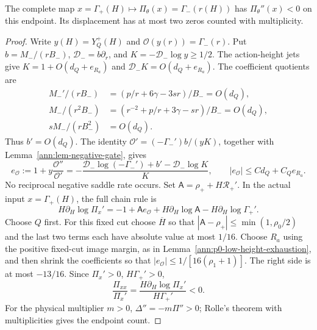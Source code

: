 \begin{proposition}\label{ann:prop-endpoint-curvature}
The complete map
\(x=\Gamma_+(H)\mapsto\Pi_\theta(x)=\Gamma_-(r(H))\)
has \(\Pi_\theta''(x)<0\) on this endpoint. Its displacement has
at most two zeros counted with multiplicity.
\end{proposition}
\begin{proof}
Write \(y(H)=Y_Q^+(H)\) and
\(\mathcal O(y(r))=\Gamma_-(r)\). Put
\(b=M_-/(rB_-)\), \(\mathcal D_-=b\partial_r\), and
\(K=-\mathcal D_-\log y\ge1/2\). The action-height jets give \(K=1+O(d_Q+e_{R_a})\) and
\(\mathcal D_-K=O(d_Q+e_{R_a})\). The coefficient quotients are
\begin{align}
 M_-'/(rB_-)&=(p/r+6\gamma-3sr)/B_-=O(d_Q),
 \label{ann:Mprime-quotient}\\
 M_-/(r^2B_-)&=(r^{-2}+p/r+3\gamma-sr)/B_-=O(d_Q),
 \label{ann:M-quotient}\\
 sM_-/(rB_-^2)&=O(d_Q).\label{ann:B-quotient}
\end{align}
Thus \(b'=O(d_Q)\). The identity
\(\mathcal O'=(-\Gamma_-')b/(yK)\), together with
Lemma~\ref{ann:lem-negative-gate}, gives
\[
 e_{\mathcal O}:=1+y\frac{\mathcal O''}{\mathcal O'}
 =-\frac{\mathcal D_-\log(-\Gamma_-')+b'-\mathcal D_-\log K}{K},
 \qquad |e_{\mathcal O}|\le Cd_Q+C_Qe_{R_a}.
\]
No reciprocal negative saddle rate occurs.
Set \(\mathsf A=\rho_++H\mathcal R_+'\). In the actual input
\(x=\Gamma_+(H)\), the full chain rule is
\begin{equation}\label{ann:complete-log-curvature}
 H\partial_H\log\Pi_x'
 =-1+\mathsf A e_{\mathcal O}
      +H\partial_H\log\mathsf A-H\partial_H\log\Gamma_+'.
\end{equation}
Choose \(Q\) first. For this fixed cut choose \(\overline H\)
so that \(|\mathsf A-\rho_+|\le\min(1,\rho_0/2)\) and the last
two terms each have absolute value at most \(1/16\).
Choose \(R_a\) using the positive fixed-cut image margin, as in
Lemma~\ref{ann:p0-low-height-exhaustion}, and then shrink the
coefficients so that
\( |e_{\mathcal O}|\le1/[16(\rho_1+1)]\).
The right side is at most \(-13/16\). Since
\(\Pi_x'>0\), \(H\Gamma_+'>0\),
\[
 \frac{\Pi_{xx}}{\Pi_x'}
 =\frac{H\partial_H\log\Pi_x'}{H\Gamma_+'}<0.
\]
For the physical multiplier \(m>0\), \(\Delta''=-m\Pi''>0\);
Rolle's theorem with multiplicities gives the endpoint count.
\end{proof}

